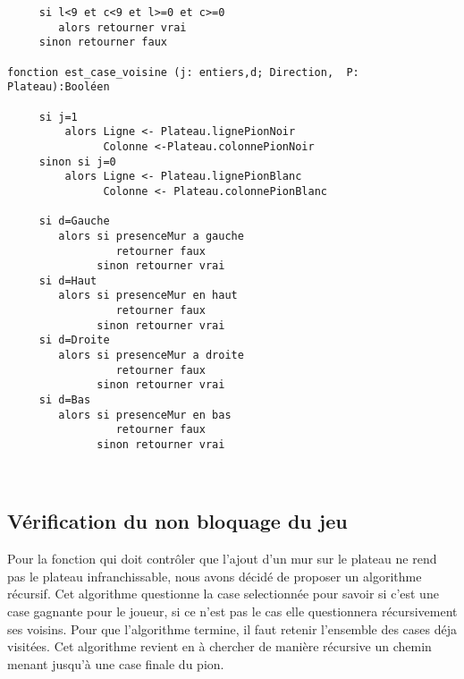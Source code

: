 \documentclass[a4paper, draft]{article}
\begin{document}
\begin{verbatim}
     si l<9 et c<9 et l>=0 et c>=0
        alors retourner vrai
     sinon retourner faux

fonction est_case_voisine (j: entiers,d; Direction,  P: Plateau):Booléen

     si j=1
         alors Ligne <- Plateau.lignePionNoir
               Colonne <-Plateau.colonnePionNoir
     sinon si j=0
         alors Ligne <- Plateau.lignePionBlanc
               Colonne <- Plateau.colonnePionBlanc 
    
     si d=Gauche
        alors si presenceMur a gauche
                 retourner faux
              sinon retourner vrai
     si d=Haut 
        alors si presenceMur en haut
                 retourner faux
              sinon retourner vrai
     si d=Droite  
        alors si presenceMur a droite
                 retourner faux
              sinon retourner vrai
     si d=Bas
        alors si presenceMur en bas
                 retourner faux
              sinon retourner vrai  

          

\end{verbatim}






\subsection{Vérification du non bloquage du jeu}

Pour la fonction qui doit contrôler que l'ajout d'un mur sur le plateau ne rend pas le plateau infranchissable, nous avons décidé de proposer un algorithme récursif.
Cet algorithme questionne  la case selectionnée pour savoir si c'est une case gagnante pour le joueur, si ce n'est pas le cas elle questionnera récursivement ses voisins. Pour que l'algorithme termine, il faut retenir l'ensemble des cases déja visitées.
Cet algorithme revient en  à chercher de manière récursive un chemin menant jusqu'à une case finale du pion.
\end{document}
